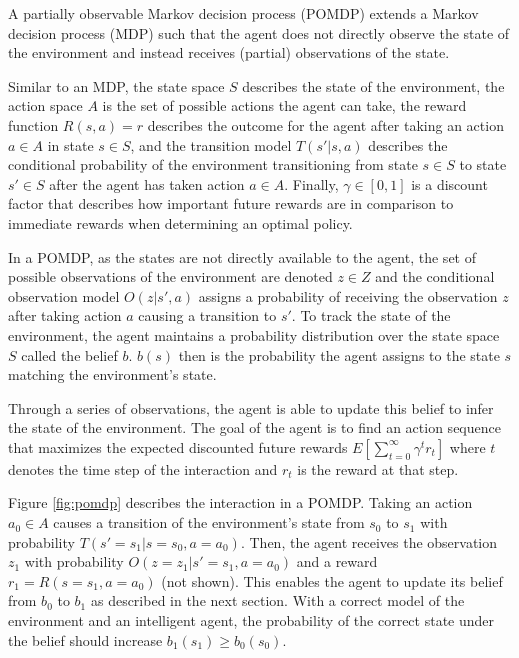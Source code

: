A partially observable Markov decision process (POMDP) extends a Markov decision process (MDP) such that the agent does not directly observe the state of the environment and instead receives (partial) observations of the state.

Similar to an MDP, the state space $S$ describes the state of the environment, the action space $A$ is the set of possible actions the agent can take, the reward function $R(s, a)=r$ describes the outcome for the agent after taking an action $a \in A$ in state $s \in S$, and the transition model $T(s'|s,a)$ describes the conditional probability of the environment transitioning from state $s \in S$ to state $s' \in S$ after the agent has taken action $a \in A$.
Finally, $\gamma \in [0,1]$ is a discount factor that describes how important future rewards are in comparison to immediate rewards when determining an optimal policy.

In a POMDP, as the states are not directly available to the agent, the set of possible observations of the environment are denoted $z \in Z$ and the conditional observation model $O(z|s',a)$ assigns a probability of receiving the observation $z$ after taking action $a$ causing a transition to $s'$.
To track the state of the environment, the agent maintains a probability distribution over the state space $S$ called the belief $b$.
$b(s)$ then is the probability the agent assigns to the state $s$ matching the environment's state.

Through a series of observations, the agent is able to update this belief to infer the state of the environment.
The goal of the agent is to find an action sequence that maximizes the expected discounted future rewards $E\left[\sum_{t=0}^\infty \gamma^t r_t \right]$ where $t$ denotes the time step of the interaction and $r_t$ is the reward at that step. 

Figure \ref{fig:pomdp} describes the interaction in a POMDP. 
Taking an action $a_0 \in A$ causes a transition of the environment's state from $s_0$ to $s_1$ with probability $T(s'=s_1|s=s_0,a=a_0)$. 
Then, the agent receives the observation $z_1$ with probability $O(z=z_1|s'=s_1,a=a_0)$ and a reward $r_1=R(s=s_1,a=a_0)$ (not shown).
This enables the agent to update its belief from $b_0$ to $b_1$ as described in the next section.
With a correct model of the environment and an intelligent agent, the probability of the correct state under the belief should increase $b_1(s_1) \geq b_0(s_0)$.

